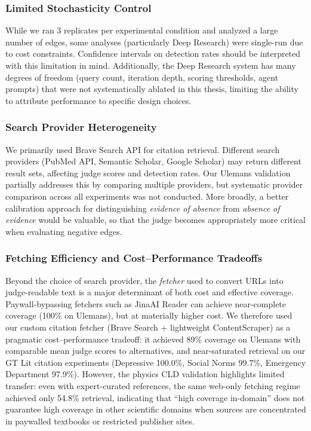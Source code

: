 \subsubsection{Limited Stochasticity Control}

While we ran 3 replicates per experimental condition and analyzed a large number of edges, some analyses (particularly Deep Research) were single-run due to cost constraints. Confidence intervals on detection rates should be interpreted with this limitation in mind.
Additionally, the Deep Research system has many degrees of freedom (query count, iteration depth, scoring thresholds, agent prompts) that were not systematically ablated in this thesis, limiting the ability to attribute performance to specific design choices.

\subsubsection{Search Provider Heterogeneity}

We primarily used Brave Search API for citation retrieval. Different search providers (PubMed API, Semantic Scholar, Google Scholar) may return different result sets, affecting judge scores and detection rates. Our Ulemans validation partially addresses this by comparing multiple providers, but systematic provider comparison across all experiments was not conducted. More broadly, a better calibration approach for distinguishing \textit{evidence of absence} from \textit{absence of evidence} would be valuable, so that the judge becomes appropriately more critical when evaluating negative edges.

\subsubsection{Fetching Efficiency and Cost--Performance Tradeoffs}

Beyond the choice of search provider, the \textit{fetcher} used to convert URLs into judge-readable text is a major determinant of both cost and effective coverage. Paywall-bypassing fetchers such as JinaAI Reader can achieve near-complete coverage (100\% on Ulemans), but at materially higher cost. We therefore used our custom citation fetcher (Brave Search + lightweight ContentScraper) as a pragmatic cost--performance tradeoff: it achieved 89\% coverage on Ulemans with comparable mean judge scores to alternatives, and near-saturated retrieval on our GT Lit citation experiments (Depressive 100.0\%, Social Norms 99.7\%, Emergency Department 97.9\%). However, the physics CLD validation highlights limited transfer: even with expert-curated references, the same web-only fetching regime achieved only 54.8\% retrieval, indicating that ``high coverage in-domain'' does not guarantee high coverage in other scientific domains when sources are concentrated in paywalled textbooks or restricted publisher sites.

